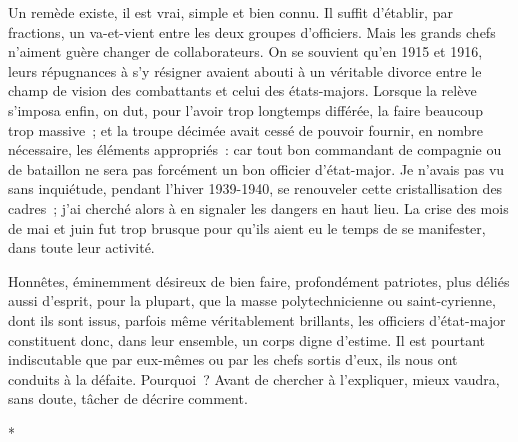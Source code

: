 \documentclass[french,twoside]{book} %
\begin{document}
Un remède existe, il est vrai, simple et bien connu. Il suffit d’établir, par fractions, un va-et-vient entre les deux groupes d’officiers. Mais les grands chefs n’aiment guère changer de collaborateurs. On se souvient qu’en 1915 et 1916, leurs répugnances à s’y résigner avaient abouti à un véritable divorce entre   le champ de vision des combattants et celui des états-majors. Lorsque la relève s’imposa enfin, on dut, pour l’avoir trop longtemps différée, la faire beaucoup trop massive ; et la troupe décimée avait cessé de pouvoir fournir, en nombre nécessaire, les éléments appropriés : car tout bon commandant de compagnie ou de bataillon ne sera pas forcément un bon officier d’état-major. Je n’avais pas vu sans inquiétude, pendant l’hiver 1939-1940, se renouveler cette cristallisation des cadres ; j’ai cherché alors à en signaler les dangers en haut lieu. La crise des mois de mai et juin fut trop brusque pour qu’ils aient eu le temps de se manifester, dans toute leur activité.\par
Honnêtes, éminemment désireux de bien faire, profondément patriotes, plus déliés aussi d’esprit, pour la plupart, que la masse polytechnicienne ou saint-cyrienne, dont ils sont issus, parfois même véritablement brillants, les officiers d’état-major constituent donc, dans leur ensemble, un corps digne d’estime. Il est pourtant indiscutable que par eux-mêmes ou par les chefs sortis d’eux, ils nous ont conduits à la défaite. Pourquoi ? Avant de chercher à l’expliquer, mieux vaudra, sans doute, tâcher de décrire comment.\par

\begin{center}
*\par
\end{center}
\end{document}
